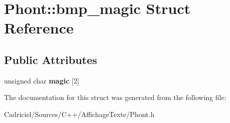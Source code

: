 \hypertarget{struct_phont_1_1bmp__magic}{\section{Phont\-:\-:bmp\-\_\-magic Struct Reference}
\label{struct_phont_1_1bmp__magic}
}
\subsection*{Public Attributes}
\begin{DoxyCompactItemize}
\item 
\hypertarget{struct_phont_1_1bmp__magic_aab20fb5938bc10575e314898c87a1934}{unsigned char {\bfseries magic} \mbox{[}2\mbox{]}}\label{struct_phont_1_1bmp__magic_aab20fb5938bc10575e314898c87a1934}

\end{DoxyCompactItemize}


The documentation for this struct was generated from the following file\-:\begin{DoxyCompactItemize}
\item 
Cadriciel/\-Sources/\-C++/\-Affichage\-Texte/Phont.\-h\end{DoxyCompactItemize}

